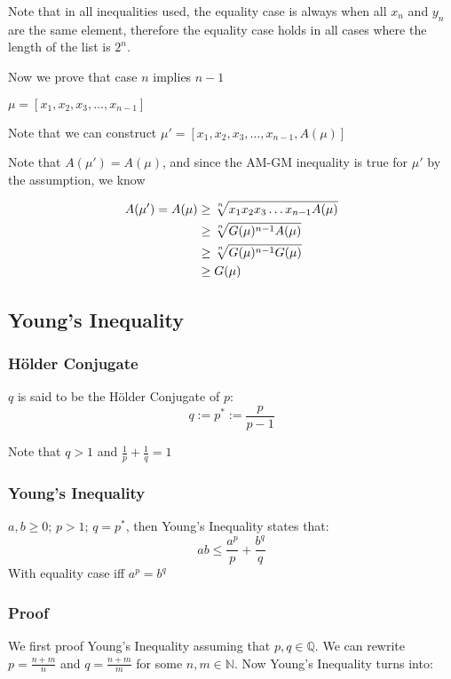 Note that in all inequalities used, the equality case is always when all $x_n$
and $y_n$ are the same element, therefore the equality case holds in all cases
where the length of the list is $2^n$.

Now we prove that case $n$ implies $n-1$

$\mu = [x_1, x_2, x_3, \dots, x_{n - 1}]$

Note that we can construct $\mu' = [x_1, x_2, x_3, \dots, x_{n - 1}, A(\mu)]$

Note that $A(\mu') = A(\mu)$, and since the AM-GM inequality is true for $\mu'$
by the assumption, we know

\begin{align*}
    A(\mu') = A(\mu) &\geq \sqrt[\uproot{2} n]{x_1x_2x_3\dots x_{n - 1}A(\mu)}\\
                     &\geq \sqrt[\uproot{2} n]{G(\mu)^{n-1}A(\mu)}\\
                     &\geq \sqrt[\uproot{2} n]{G(\mu)^{n-1}G(\mu)}\\
                     &\geq G(\mu)
\end{align*}

\subsection{Young's Inequality}
\subsubsection{H\"{o}lder Conjugate}
$q$ is said to be the H\"{o}lder Conjugate of $p$:
$$q := p^* := \frac{p}{p - 1}$$

Note that $q > 1$ and $\frac{1}{p} + \frac{1}{q} = 1$

\subsubsection{Young's Inequality}
$a, b \geq 0$; $p > 1$; $q = p^*$, then Young's Inequality states that:
$$ab \leq \frac{a^p}{p} + \frac{b^q}{q}$$
With equality case iff $a^p = b^q$

\subsubsection{Proof}
We first proof Young's Inequality assuming that $p, q \in \mathbb{Q}$.
We can rewrite $p = \frac{n + m}{n}$ and $q = \frac{n + m}{m}$ for some $n, m
\in \mathbb{N}$. Now Young's Inequality turns into:

